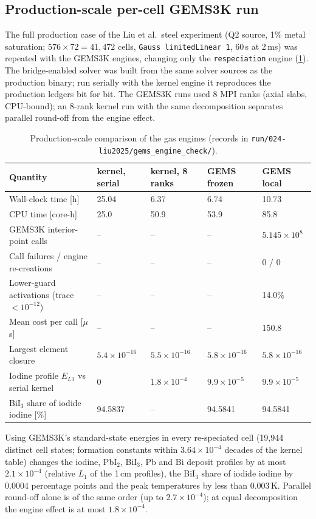 \documentclass[11pt,a4paper]{article}
\begin{document}
\subsection{Production-scale per-cell GEMS3K run}
\label{sec:pending}

The full production case of the Liu et al.\ steel experiment (Q2
source, 1\% metal saturation; $576\times72=41{,}472$ cells,
\texttt{Gauss limitedLinear 1}, 60\,s at 2\,ms) was repeated with the
GEMS3K engines, changing only the \texttt{respeciation} engine
(\cref{tab:pending}). The bridge-enabled solver was built from the same
solver sources as the production binary; run serially with the kernel
engine it reproduces the production ledgers bit for bit. The GEMS3K runs
used 8 MPI ranks (axial slabs, CPU-bound); an 8-rank kernel run with the
same decomposition separates parallel round-off from the engine effect.

\begin{table}[tb]
\centering
\caption{Production-scale comparison of the gas engines (records in
\texttt{run/024-liu2025/gems\_engine\_check/}).}
\label{tab:pending}
\small
\begin{tabular}{lllll}
\toprule
Quantity & kernel, serial & kernel, 8 ranks & GEMS frozen & GEMS local\\
\midrule
Wall-clock time [h] & 25.04 & 6.37 & 6.74 & 10.73\\
CPU time [core-h] & 25.0 & 50.9 & 53.9 & 85.8\\
GEMS3K interior-point calls & -- & -- & -- & $5.145\times10^{8}$\\
Call failures / engine re-creations & -- & -- & -- & 0 / 0\\
Lower-guard activations (trace $<10^{-12}$) & -- & -- & -- & 14.0\%\\
Mean cost per call [$\mu$s] & -- & -- & -- & 150.8\\
Largest element closure & $5.4\times10^{-16}$ & $5.5\times10^{-16}$ & $5.8\times10^{-16}$ & $5.8\times10^{-16}$\\
Iodine profile $E_{L1}$ vs serial kernel & 0 & $1.8\times10^{-4}$ & $9.9\times10^{-5}$ & $9.9\times10^{-5}$\\
BiI$_3$ share of iodide iodine [\%] & 94.5837 & -- & 94.5841 & 94.5841\\
\bottomrule
\end{tabular}
\end{table}

Using GEMS3K's standard-state energies in every re-speciated cell
(19,944 distinct cell states; formation constants within
$3.64\times10^{-4}$ decades of the kernel table) changes the iodine,
PbI$_2$, BiI$_3$, Pb and Bi deposit profiles by at most
$2.1\times10^{-4}$ (relative $L_1$ of the 1\,cm profiles), the BiI$_3$
share of iodide iodine by 0.0004 percentage points and the peak
temperatures by less than 0.003\,K. Parallel round-off alone is of the
same order (up to $2.7\times10^{-4}$); at equal decomposition the engine
effect is at most $1.8\times10^{-4}$.
\end{document}

